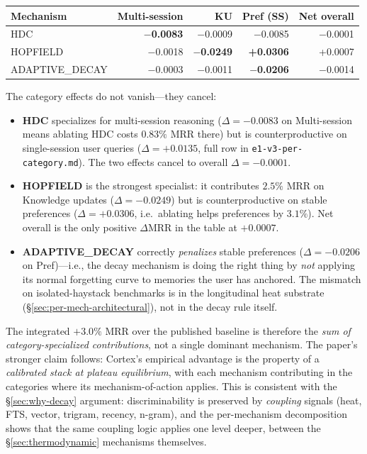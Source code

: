 \documentclass[11pt]{article}
\begin{document}
\begin{center}
\small
\begin{tabular}{lrrrr}
\toprule
Mechanism       & Multi-session & KU            & Pref (SS) & Net overall \\
\midrule
HDC             & \textbf{$-$0.0083} & $-$0.0009          & $-$0.0085          & $-$0.0001 \\
HOPFIELD        & $-$0.0018          & \textbf{$-$0.0249} & \textbf{+0.0306}   & +0.0007   \\
ADAPTIVE\_DECAY & $-$0.0003          & $-$0.0011          & \textbf{$-$0.0206} & $-$0.0014 \\
\bottomrule
\end{tabular}
\end{center}

The category effects do not vanish---they cancel:

\begin{itemize}
\item \textbf{HDC} specializes for multi-session reasoning
  ($\Delta = -0.0083$ on Multi-session means ablating HDC costs
  $0.83\%$ MRR there) but is counterproductive on single-session
  user queries ($\Delta = +0.0135$, full row in
  \texttt{e1-v3-per-category.md}).  The two effects cancel to overall
  $\Delta = -0.0001$.
\item \textbf{HOPFIELD} is the strongest specialist: it contributes
  $2.5\%$ MRR on Knowledge updates ($\Delta = -0.0249$) but is
  counterproductive on stable preferences ($\Delta = +0.0306$, i.e.\
  ablating helps preferences by $3.1\%$).  Net overall is the only
  positive $\Delta$MRR in the table at $+0.0007$.
\item \textbf{ADAPTIVE\_DECAY} correctly \emph{penalizes} stable
  preferences ($\Delta = -0.0206$ on Pref)---i.e., the decay
  mechanism is doing the right thing by \emph{not} applying its
  normal forgetting curve to memories the user has anchored.  The
  mismatch on isolated-haystack benchmarks is in the longitudinal
  heat substrate (\S\ref{sec:per-mech-architectural}), not in the
  decay rule itself.
\end{itemize}

The integrated $+3.0\%$ MRR over the published baseline is therefore
the \emph{sum of category-specialized contributions}, not a single
dominant mechanism.  The paper's stronger claim follows: Cortex's
empirical advantage is the property of a \emph{calibrated stack at
plateau equilibrium}, with each mechanism contributing in the
categories where its mechanism-of-action applies.  This is consistent
with the \S\ref{sec:why-decay} argument: discriminability is
preserved by \emph{coupling} signals (heat, FTS, vector, trigram,
recency, n-gram), and the per-mechanism decomposition shows that the
same coupling logic applies one level deeper, between the
\S\ref{sec:thermodynamic} mechanisms themselves.
\end{document}
